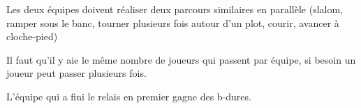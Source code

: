 \documentclass{grand-jeu}
\begin{document}
\begin{liste-materiel}
\end{liste-materiel}

\begin{regles}
Les deux équipes doivent réaliser deux parcours similaires en parallèle (slalom, ramper sous le banc, tourner plusieurs fois autour d'un plot, courir, avancer à cloche-pied)

Il faut qu'il y aie le même nombre de joueurs qui passent par équipe, si besoin un joueur peut passer plusieurs fois.

L'équipe qui a fini le relais en premier gagne des b-dures. 
\end{regles}

\begin{imaginaire}
\end{imaginaire}

\begin{moments-stop}
\end{moments-stop}
\end{document}
